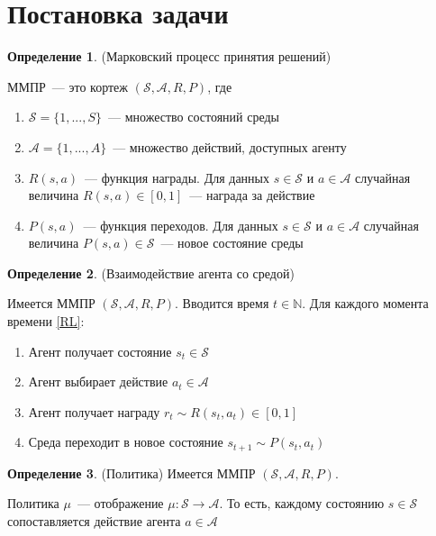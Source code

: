 \documentclass[a4paper]{article}
\newcommand{\N}{\mathbb{N}}
\newcommand{\Ss}{\mathcal{S}}
\newcommand{\A}{\mathcal{A}}
\begin{document}
\newpage
\section{Постановка задачи}

\theoremstyle{definition}
\newtheorem{definition}{Определение}[section]
\newtheorem{lemma}{Лемма}[section]
\newtheorem{theorem}{Теорема}[section]
\begin{definition}{(Марковский процесс принятия решений)}
	
ММПР~--- это кортеж $(\mathcal{S}, \mathcal{A}, R, P)$, где
\begin{enumerate}
	\item $\mathcal{S}=\{1,...,S\}$~--- множество состояний среды
	\item $\mathcal{A}=\{1,...,A\}$~--- множество действий, доступных агенту
	\item $R(s,a)$~--- функция награды. Для данных $s\in \Ss$ и $a\in\A$ случайная величина $R(s, a)\in[0,1]$~--- награда за действие
	\item $P(s,a)$~--- функция переходов. Для данных $s\in \Ss$ и $a\in\A$ случайная величина $P(s, a)\in\Ss$~--- новое состояние среды
\end{enumerate}
\end{definition}

\begin{definition}{(Взаимодействие агента со средой)}

Имеется ММПР $(\Ss,\A,R,P)$. Вводится время $t\in\N$. Для каждого момента времени \ref{RL}:
\begin{enumerate}
\item Агент получает состояние $s_t\in \Ss$
\item Агент выбирает действие $a_t\in\A$
\item Агент получает награду $r_t\sim R(s_t,a_t)\in[0,1]$
\item Среда переходит в новое состояние $s_{t+1}\sim P(s_t,a_t)$
\end{enumerate}
\end{definition}

\begin{definition}{(Политика)}
Имеется ММПР $(\Ss,\A,R,P)$.

Политика $\mu$~--- отображение $\mu\colon \Ss\to\A$. То есть, каждому состоянию $s\in\Ss$ сопоставляется действие агента $a\in\A$
\end{definition}
\end{document}
